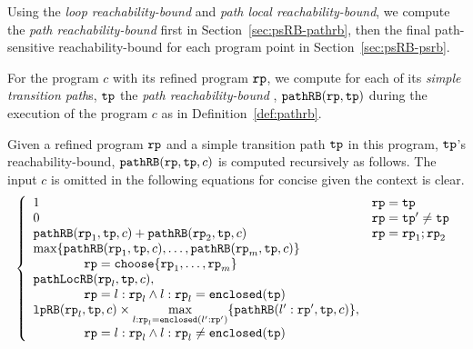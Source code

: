 Using the \emph{loop reachability-bound} and \emph{path local reachability-bound}, we compute the \emph{path reachability-bound} first in Section~\ref{sec:psRB-pathrb}, 
then the final path-sensitive reachability-bound for each program point in Section~\ref{sec:psRB-psrb}.

For the program $c$ with its refined program $\mathtt{rp}$, we compute
for each of its \emph{simple transition path}s, $\mathtt{tp}$ the \emph{path reachability-bound} , $\mathtt{pathRB}(\mathtt{rp}, \mathtt{tp})$ during the execution of the program $c$ as in Definition~\ref{def:pathrb}.
%
\begin{defn}
  \label{def:pathrb}
  Given a refined program $\mathtt{rp}$ and a simple transition path $\mathtt{tp}$ in this program, 
  $\mathtt{tp}$'s reachability-bound, $\mathtt{pathRB}(\mathtt{rp}, \mathtt{tp}, c)$
  is computed recursively as follows. 
  The input $c$ is omitted in the following equations for concise given the context is clear.
\[
  \left\{ 
  \begin{array}{ll}
    1  & \rprog = \tpath\\
    \highlight{0} & \rprog = \tpath' \neq \tpath\\
    \inoutB(\rprog_1, \tpath, c) + \inoutB(\rprog_2, \tpath, c) & \rprog = \rprog_1;\rprog_2 \\
    \max\left\{ \inoutB(\rprog_1, \tpath, c), \ldots, \inoutB(\rprog_m, \tpath, c) \right\} & \\
    \qquad \qquad  \rprog = \rpchoose{\rprog_1, \ldots, \rprog_m } \\
    \outinB(\rprog_l, \tpath, c), & \\
    \qquad \qquad  \rprog = l: \rprog_l \land l: \rprog_l  = \kw{enclosed}(\tpath) \\
    \lpchB(\rprog_l, \tpath , c)
    \times \max\limits_{l:\rprog_l = \kw{enclosed}(l':\rprog')}
   \{\inoutB(l':\rprog', \tpath, c)\}, & \\
   \qquad \qquad \rprog = l: \rprog_l \land l: \rprog_l \neq \kw{enclosed}(\tpath) \\
  \end{array}
  \right.
  \]
  \end{defn}

